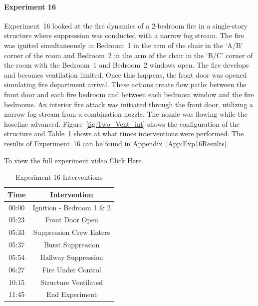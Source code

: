 \documentclass[12pt,oneside]{book}
\begin{document}
\FloatBarrier
\clearpage

\paragraph{Experiment 16}
Experiment~16 looked at the fire dynamics of a 2-bedroom fire in a single-story structure where suppression was conducted with a narrow fog stream. The fire was ignited simultaneously in Bedroom~1 in the arm of the chair in the `A/B' corner of the room and Bedroom~2 in the arm of the chair in the `B/C' corner of the room with the Bedroom~1 and Bedroom~2 windows open. The fire develops and becomes ventilation limited. Once this happens, the front door was opened simulating fire department arrival. These actions create flow paths between the front door and each fire bedroom and between each bedroom window and the fire bedrooms. An interior fire attack was initiated through the front door, utilizing a narrow fog stream from a combination nozzle. The nozzle was flowing while the hoseline advanced. Figure~\ref{fig:Two_Vent_int} shows the configuration of the structure and Table~\ref{Table:Exp16Interventions} shows at what times interventions were performed. The results of Experiment~16 can be found in Appendix~\ref{App:Exp16Results}. 

To view the full experiment video \href{https://player.vimeo.com/video/170510941?autoplay=1}{Click Here}.

\begin{table}[H]
	\centering
	\caption{Experiment 16 Interventions}
	\begin{tabular}{|c|c|} 
		\hline
		Time & Intervention \\ \hline \hline
		00:00 & Ignition - Bedroom 1 \& 2 \\ \hline
		05:23 & Front Door Open \\ \hline
		05:33 & Suppression Crew Enters\\ \hline
		05:37 & Burst Suppression \\ \hline 
		05:54 & Hallway Suppression \\ \hline
		06:27 & Fire Under Control 	\\ \hline
		10:15 & Structure Ventilated \\ \hline
		11:45 & End Experiment\\ \hline
	\end{tabular}
	\label{Table:Exp16Interventions}
\end{table}

\FloatBarrier
\clearpage
\end{document}
